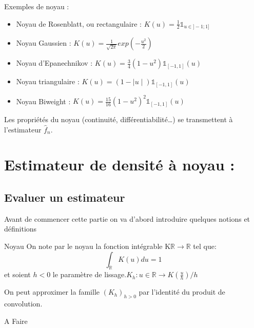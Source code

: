 \documentclass[
]{book}
\begin{document}
Exemples de noyau :

\begin{itemize}
\item
  Noyau de Rosenblatt, ou rectangulaire : \(K(u)= \frac12 \mathds{1}_{u\in]-1;1]}\)
\item
  Noyau Gaussien : \(K(u) =\frac1{\sqrt{2\pi}}exp(-\frac{u^2}2)\)
\item
  Noyau d'Epanechnikov : \(K(u) =\frac34(1-u^2)\mathds{1}_{[-1,1]}(u)\)
\item
  Noyau triangulaire : \(K(u) = (1-\mid u \mid)\mathds{1}_{[-1,1]}(u)\)
\item
  Noyau Biweight : \(K(u) = \frac{15}{16}(1-u^2)^2\mathds{1}_{[-1,1]}(u)\)
\end{itemize}

Les propriétés du noyau (continuité, différentiabilité\ldots) se transmettent à l'estimateur \(\hat f_n\).

\hypertarget{estimateur-de-densituxe9-uxe0-noyau}{%
\chapter{Estimateur de densité à noyau :}\label{estimateur-de-densituxe9-uxe0-noyau}}

\hypertarget{evaluer-un-estimateur}{%
\section{Evaluer un estimateur}\label{evaluer-un-estimateur}}

Avant de commencer cette partie on va d'abord introduire quelques notions et définitions\newline

\begin{dfn} {Noyau}  
On note par le noyau la fonction intégrable K$\mathbb{R}\rightarrow\mathbb{R}$ tel que:
$$\int_{\mathbb{R}}K(u)du =1$$
et soient $h<0$ le paramètre de lissage.\newline $K_h : u\in \mathbb{R} \rightarrow K(\frac{u}{h})/h$

\end{dfn}

\begin{lem}
On peut approximer la famille $(K_h)_{h>0}$ par l'identité du produit de convolution.
\end{lem}

\begin{demo}
A Faire
\end{demo}
\end{document}
